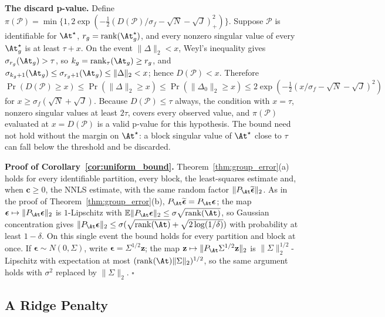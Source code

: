 \noindent\textbf{The discard p-value.}  Define
\(\pi(\mathcal P)=\min\{1,2\exp(-\tfrac12(D(\mathcal P)/\sigma_f-\sqrt N-\sqrt J)_+^2)\}\).
Suppose \(\mathcal P\) is identifiable for
\(\At^\star\), \(r_g=\operatorname{rank}(\At^\star_g)\), and every nonzero singular value
of every \(\At^\star_g\) is at least \(\tau+x\).  On the event \(\|\Delta\|_2<x\), Weyl's
inequality gives \(\sigma_{r_g}(\At_g)>\tau\), so \(k_g=\operatorname{rank}_\tau(\At_g)\ge r_g\),
and \(\sigma_{k_g+1}(\At_g)\le\sigma_{r_g+1}(\At_g)\le\|\Delta\|_2<x\); hence
\(D(\mathcal P)<x\).  Therefore \(\Pr(D(\mathcal P)\ge x)\le\Pr(\|\Delta\|_2\ge x)\le
\Pr(\|\Delta_0\|_2\ge x)\le2\exp(-\tfrac12(x/\sigma_f-\sqrt N-\sqrt J)^2)\) for
\(x\ge\sigma_f(\sqrt N+\sqrt J)\).  Because \(D(\mathcal P)\le\tau\) always, the condition
with \(x=\tau\), nonzero singular values at least \(2\tau\), covers every observed value,
and \(\pi(\mathcal P)\) evaluated at \(x=D(\mathcal P)\) is a valid p-value for this
hypothesis.  The bound need not hold without the margin on \(\At^\star\): a block singular
value of \(\At^\star\) close to \(\tau\) can fall below the threshold and be discarded.

\noindent\textbf{Proof of Corollary~\ref{cor:uniform_bound}.}
Theorem~\ref{thm:group_error}(a) holds for every identifiable partition, every block,
the least-squares estimate and, when \(\mathbf c\ge0\), the NNLS estimate, with the same
random factor \(\|P_{\At}\widetilde{\boldsymbol\epsilon}\|_2\).
As in the proof of Theorem~\ref{thm:group_error}(b),
\(P_{\At}\widetilde{\boldsymbol\epsilon}=P_{\At}\boldsymbol\epsilon\); the map
\(\boldsymbol\epsilon\mapsto\|P_{\At}\boldsymbol\epsilon\|_2\) is \(1\)-Lipschitz with
\(\mathbb E\|P_{\At}\boldsymbol\epsilon\|_2\le\sigma\sqrt{\operatorname{rank}(\At)}\), so
Gaussian concentration gives
\(\|P_{\At}\boldsymbol\epsilon\|_2\le\sigma(\sqrt{\operatorname{rank}(\At)}+\sqrt{2\log(1/\delta)})\)
with probability at least \(1-\delta\).  On this single event the bound holds for every
partition and block at once.  If \(\boldsymbol\epsilon\sim N(0,\Sigma)\), write
\(\boldsymbol\epsilon=\Sigma^{1/2}\mathbf z\); the map
\(\mathbf z\mapsto\|P_{\At}\Sigma^{1/2}\mathbf z\|_2\) is \(\|\Sigma\|_2^{1/2}\)-Lipschitz
with expectation at most \((\operatorname{rank}(\At)\|\Sigma\|_2)^{1/2}\), so the same
argument holds with \(\sigma^2\) replaced by \(\|\Sigma\|_2\).  \(\square\)


\subsection{A Ridge Penalty}

